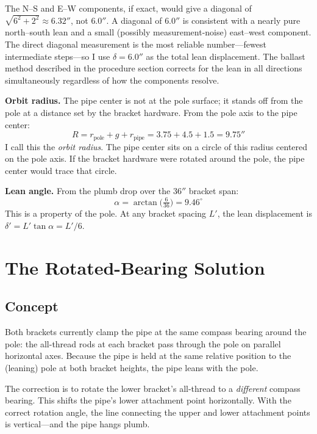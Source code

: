 \documentclass[11pt,twocolumn]{article}
\begin{document}
The N--S and E--W components, if exact, would give a diagonal of
$\sqrt{6^2 + 2^2} \approx 6.32''$, not $6.0''$. A diagonal of $6.0''$ is
consistent with a nearly pure north--south lean and a small (possibly
measurement-noise) east--west component. The direct diagonal measurement is
the most reliable number---fewest intermediate steps---so I use $\delta = 6.0''$
as the total lean displacement. The ballast method described in the procedure
section corrects for the lean in all directions simultaneously regardless of
how the components resolve.

\textbf{Orbit radius.} The pipe center is not at the pole surface; it stands
off from the pole at a distance set by the bracket hardware. From the pole axis
to the pipe center:
%
\begin{equation}
  R = r_\text{pole} + g + r_\text{pipe} = 3.75 + 4.5 + 1.5 = 9.75''
  \label{eq:R}
\end{equation}
%
I call this the \emph{orbit radius}. The pipe center sits on a circle of this
radius centered on the pole axis. If the bracket hardware were rotated around
the pole, the pipe center would trace that circle.

\textbf{Lean angle.} From the plumb drop over the $36''$ bracket span:
%
\begin{equation}
  \alpha = \arctan\!\bigl(\tfrac{6}{36}\bigr) = 9.46^\circ
  \label{eq:alpha}
\end{equation}
%
This is a property of the pole. At any bracket spacing $L'$, the lean
displacement is $\delta' = L' \tan \alpha = L' / 6$.

\section{The Rotated-Bearing Solution}

\subsection{Concept}

Both brackets currently clamp the pipe at the same compass bearing around the
pole: the all-thread rods at each bracket pass through the pole on parallel
horizontal axes. Because the pipe is held at the same relative position to the
(leaning) pole at both bracket heights, the pipe leans with the pole.

The correction is to rotate the lower bracket's all-thread to a \emph{different}
compass bearing. This shifts the pipe's lower attachment point horizontally.
With the correct rotation angle, the line connecting the upper and lower
attachment points is vertical---and the pipe hangs plumb.
\end{document}
